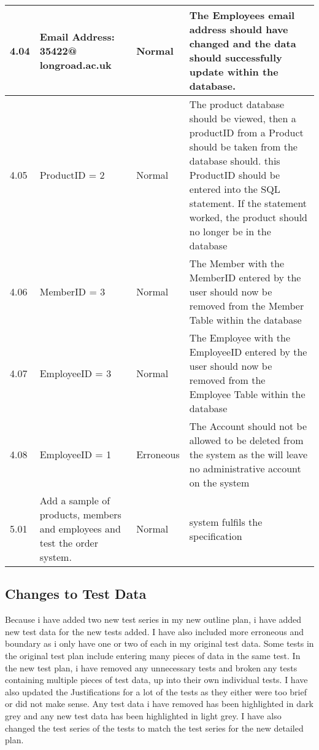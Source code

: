 \begin{flushleft}
\begin{longtable}{|p{1.5cm}|p{2.5cm}|p{2cm}|p{4.5cm}|}
	4.04 & Email Address: 35422@ longroad.ac.uk  & Normal & The Employees email address should have changed and the data should successfully update within the database. \\ \hline
	4.05 & ProductID = 2 & Normal & The product database should be viewed, then a productID from a Product should be taken from the database should. this ProductID should be entered into the SQL statement. If the statement worked, the product should no longer be in the database\\ \hline
	4.06 & MemberID = 3 & Normal & The Member with the MemberID entered by the user should now be removed from the Member Table within the database \\ \hline
	4.07 & EmployeeID = 3 & Normal & The Employee with the EmployeeID entered by the user should now be removed from the Employee Table within the database \\ \hline
	4.08 &  EmployeeID = 1 & Erroneous & The Account should not be allowed to be deleted from the system as the will leave no administrative account on the system \\ \hline
	5.01 &  Add a sample of products, members and employees and test the order system.  & Normal &system fulfils the specification \\ \hline
    \end{longtable}
\end{flushleft}

\subsection{Changes to Test Data}
	
Because i have added two new test series in my new outline plan, i have added new test data for the new tests added. I have also included more erroneous and boundary as i only have one or two of each in my original test data. Some tests in the original test plan include entering many pieces of data in the same test. In the new test plan, i have removed any unnecessary tests and broken any tests containing multiple pieces of test data, up into their own individual tests. I have also updated the Justifications for a lot of the tests as they either were too brief or did not make sense. Any test data i have removed has been highlighted in dark grey and any new test data has been highlighted in light grey. I have also changed the test series of the tests to match the test series for the new detailed plan.

